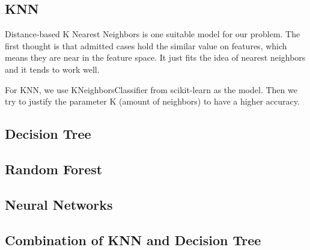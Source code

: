 \documentclass{article}
\begin{document}
\subsection{KNN}

Distance-based K Nearest Neighbors is one suitable model for our problem. The first thought is that admitted cases hold the similar value on features, which means they are near in the feature space. It just fits the idea of nearest neighbors and it tends to work well.

For KNN, we use KNeighborsClassifier from scikit-learn as the model. Then we try to justify the parameter K (amount of neighbors) to have a higher accuracy.

\subsection{Decision Tree}

\subsection{Random Forest}

\subsection{Neural Networks}

\subsection{Combination of KNN and Decision Tree}











\end{document}
